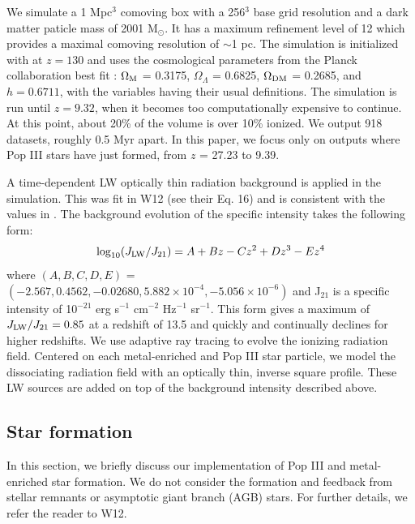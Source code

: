 \documentclass[a4paper,fleqn,usenatbib]{mnras}
\begin{document}
We simulate a 1 Mpc$^{3}$ comoving box with a 256$^{3}$ base grid 
resolution and a dark matter paticle mass of 2001 M$_{\odot}$. It has a maximum refinement level of 12 which provides a maximal comoving resolution of $\sim$1 pc. The simulation is 
initialized with \music{} \citep{Hahn11_MUSIC} at $z = 130$ and uses the cosmological parameters from the Planck collaboration best fit 
\citet{Planck13_Cosmo}: $\Omega_{\rm M}$ = 0.3175, $\Omega_{\Lambda}$ = 
0.6825, $\Omega_{\rm DM}$ = 0.2685, and $h = 0.6711$, with the variables 
having their usual definitions. The simulation is run until $z = 9.32$, when it becomes too computationally expensive to continue. At this point, about 20\% of the volume is over 10\% ionized. We output 918 datasets,  roughly 0.5 Myr apart. In this paper, we focus only on outputs where Pop III stars have just formed, from $z$ = 27.23 to 9.39.

A time-dependent LW optically thin radiation background is applied in the simulation. This was fit in W12 (see their Eq. 16) and is consistent with the values in \citet{Trenti09_SFR}. The background evolution of the specific intensity takes the following form:
\begin{equation} \label{LWbg}
	\log_{10}(J_{\rm LW}/J_{21}) = A + Bz - Cz^{2} + Dz^{3} - Ez^{4}
\end{equation}
where $(A, B, C, D, E)$ = $(-2.567, 0.4562, - 0.02680, 5.882 \times 10^{-4}, - 5.056 \times 10^{-6})$ and J$_{21}$ is a specific intensity of 10$^{-21}$ erg s$^{-1}$ cm$^{-2}$ Hz$^{-1}$ sr$^{-1}$.  This form gives a maximum of $J_{\rm LW}/J_{21} = 0.85$ at a redshift of 13.5 and quickly and continually declines for higher redshifts. We use adaptive ray tracing \citep{Abel02_RT, Wise11_Moray} to evolve the ionizing radiation field. Centered on each metal-enriched and Pop III star particle, we model the \hh{} dissociating radiation field with an optically thin, inverse square profile. These LW sources are added on top of the background intensity described above.
\subsection{Star formation}
In this section, we briefly discuss our implementation of Pop III and metal-enriched star formation. We do not consider the formation and feedback from stellar remnants or asymptotic giant branch (AGB) stars. For further details, we refer the reader to W12. 
\end{document}
